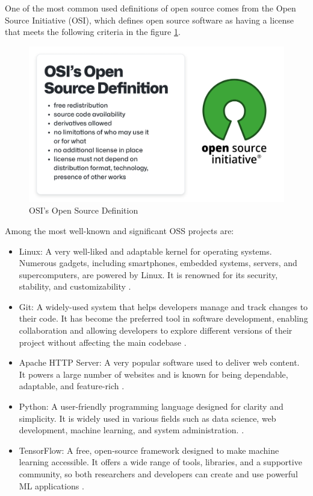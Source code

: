 One of the most common used definitions of open source comes from the Open Source Initiative (OSI), which defines open source software as having a license that meets the following criteria in the figure \ref{fig:osidef}.

\begin{figure}[ht]
    \includegraphics[width=12cm]{figs/osiopensourcedef.png}
    \centering
    \caption{OSI's Open Source Definition \cite{HaeussgeDevGuide}}
    \label{fig:osidef}
\end{figure}



Among the most well-known and significant OSS projects are:
\begin{itemize}
    \item Linux: A very well-liked and adaptable kernel for operating systems. Numerous gadgets, including smartphones, embedded systems, servers, and supercomputers, are powered by Linux. It is renowned for its security, stability, and customizability \cite{fink2003business}.
    \item Git: A widely-used system that helps developers manage and track changes to their code. It has become the preferred tool in software development, enabling collaboration and allowing developers to explore different versions of their project without affecting the main codebase \cite{loeliger2012version}.
    \item Apache HTTP Server: A very popular software used to deliver web content. It powers a large number of websites and is known for being dependable, adaptable, and feature-rich \cite{fielding1997apache}.
    \item  Python: A user-friendly programming language designed for clarity and simplicity. It is widely used in various fields such as data science, web development, machine learning, and system administration. \cite{srinath2017python}.
    \item TensorFlow: A free, open-source framework designed to make machine learning accessible. It offers a wide range of tools, libraries, and a supportive community, so both researchers and developers can create and use powerful ML applications \cite{developers2022tensorflow}.
\end{itemize}

